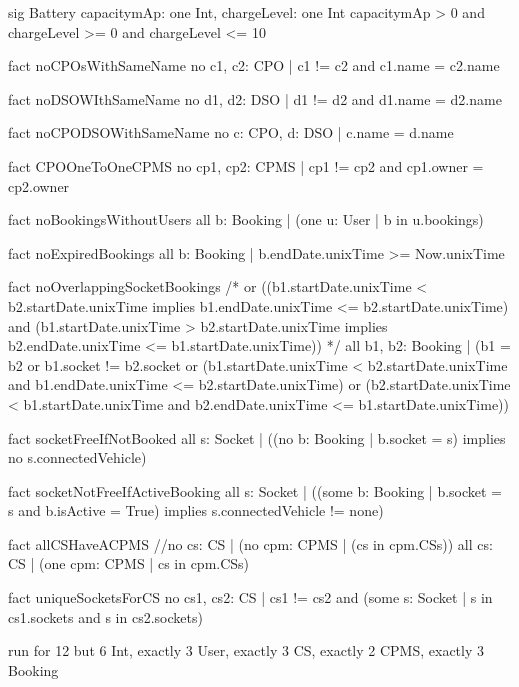 \documentclass[11pt]{article}
\begin{document}
\begin{ffcode}
    sig Battery {
    	capacitymAp: one Int,
    	chargeLevel: one Int
    } {
    	capacitymAp > 0 and
    	chargeLevel >= 0 and chargeLevel <= 10
    }
    
    fact noCPOsWithSameName {
    	no c1, c2: CPO | c1 != c2 and c1.name = c2.name
    }
    
    fact noDSOWIthSameName {
    	no d1, d2: DSO | d1 != d2 and d1.name = d2.name
    }
    
    fact noCPODSOWithSameName {
    	no c: CPO, d: DSO | c.name = d.name
    }
    
    fact CPOOneToOneCPMS {
    	no cp1, cp2: CPMS | cp1 != cp2 and cp1.owner = cp2.owner
    }
    
    fact noBookingsWithoutUsers {
    	all b: Booking | (one u: User | b in u.bookings)
    }
    
    fact noExpiredBookings {
    	all b: Booking | b.endDate.unixTime >= Now.unixTime
    }
    
    fact noOverlappingSocketBookings {
    	/*
    	or ((b1.startDate.unixTime < b2.startDate.unixTime implies b1.endDate.unixTime <= b2.startDate.unixTime) and (b1.startDate.unixTime > b2.startDate.unixTime implies b2.endDate.unixTime <= b1.startDate.unixTime))
    	*/
    	all b1, b2: Booking | (b1 = b2 or b1.socket != b2.socket or (b1.startDate.unixTime < b2.startDate.unixTime and b1.endDate.unixTime <= b2.startDate.unixTime)
    	or (b2.startDate.unixTime < b1.startDate.unixTime and b2.endDate.unixTime <= b1.startDate.unixTime))
    }
    
    fact socketFreeIfNotBooked {
    	all s: Socket | ((no b: Booking | b.socket = s)
    	implies 
    	no s.connectedVehicle)
    }
    
    fact socketNotFreeIfActiveBooking {
    	all s: Socket | ((some b: Booking | b.socket = s and b.isActive = True)
    	implies 
    	s.connectedVehicle != none)
    }
    
    fact allCSHaveACPMS {
    	//no cs: CS | (no cpm: CPMS | (cs in cpm.CSs))
    	all cs: CS | (one cpm: CPMS | cs in cpm.CSs)
    }
    
    fact uniqueSocketsForCS {
    	no cs1, cs2: CS | cs1 != cs2 and (some s: Socket | s in cs1.sockets and s in cs2.sockets)
    }
    
    run {} for 12 but 6 Int, exactly 3 User, exactly 3 CS, exactly 2 CPMS, exactly 3 Booking
    
\end{ffcode}

\newpage
\end{document}
